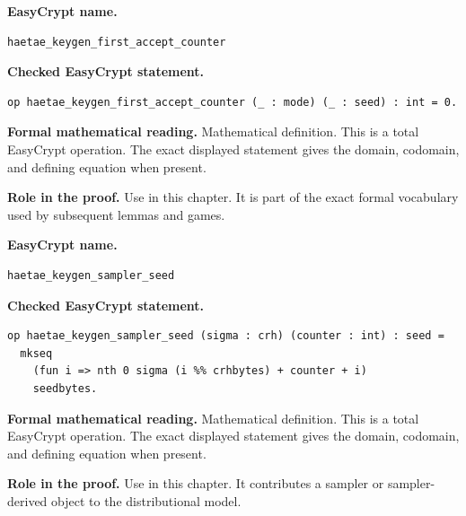 \begin{formaldefinition}
\noindent\textbf{EasyCrypt name.}
\begin{lstlisting}[language=EasyCrypt,basicstyle=\ttfamily\scriptsize]
haetae_keygen_first_accept_counter
\end{lstlisting}
\noindent\textbf{Checked EasyCrypt statement.}
\begin{lstlisting}[language=EasyCrypt,basicstyle=\ttfamily\scriptsize]
op haetae_keygen_first_accept_counter (_ : mode) (_ : seed) : int = 0.
\end{lstlisting}
\noindent\textbf{Formal mathematical reading.}
Mathematical definition. This is a total EasyCrypt operation.  The exact displayed statement gives the domain, codomain, and defining equation when present.

\noindent\textbf{Role in the proof.}
Use in this chapter. It is part of the exact formal vocabulary used by subsequent lemmas and games.

\end{formaldefinition}

\begin{formaldefinition}
\noindent\textbf{EasyCrypt name.}
\begin{lstlisting}[language=EasyCrypt,basicstyle=\ttfamily\scriptsize]
haetae_keygen_sampler_seed
\end{lstlisting}
\noindent\textbf{Checked EasyCrypt statement.}
\begin{lstlisting}[language=EasyCrypt,basicstyle=\ttfamily\scriptsize]
op haetae_keygen_sampler_seed (sigma : crh) (counter : int) : seed =
  mkseq
    (fun i => nth 0 sigma (i %% crhbytes) + counter + i)
    seedbytes.
\end{lstlisting}
\noindent\textbf{Formal mathematical reading.}
Mathematical definition. This is a total EasyCrypt operation.  The exact displayed statement gives the domain, codomain, and defining equation when present.

\noindent\textbf{Role in the proof.}
Use in this chapter. It contributes a sampler or sampler-derived object to the distributional model.

\end{formaldefinition}

